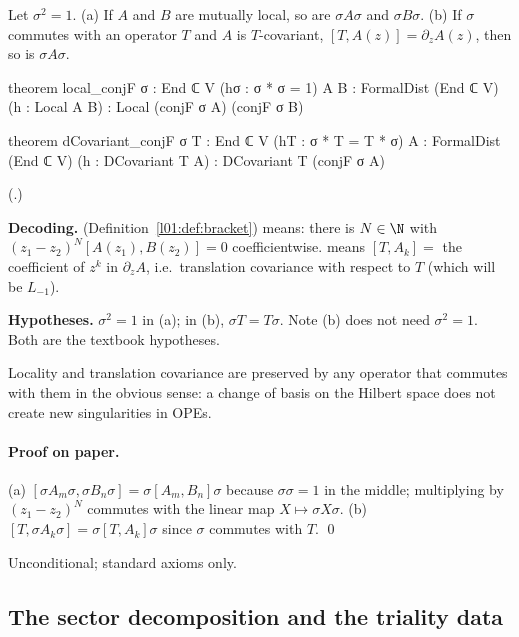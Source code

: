 \begin{proposition}\label{ch14:prop:conj}
Let $\sigma^2=1$.  (a) If $A$ and $B$ are mutually local, so are $\sigma A\sigma$ and $\sigma B\sigma$.
(b) If $\sigma$ commutes with an operator $T$ and $A$ is $T$-covariant, $[T,A(z)]=\partial_zA(z)$,
then so is $\sigma A\sigma$.
\end{proposition}
\begin{leancode}
theorem local_conjF {σ : End ℂ V} (hσ : σ * σ = 1) {A B : FormalDist (End ℂ V)}
    (h : Local A B) : Local (conjF σ A) (conjF σ B)

theorem dCovariant_conjF {σ T : End ℂ V} (hT : σ * T = T * σ)
    {A : FormalDist (End ℂ V)} (h : DCovariant T A) : DCovariant T (conjF σ A)
\end{leancode}
(.)

\begin{dictionary}
\textbf{Decoding.}   (Definition~\ref{l01:def:bracket}) means: there is $N\in\N$ with
$(z_1-z_2)^N[A(z_1),B(z_2)]=0$ coefficientwise.   means
$[T,A_k]=$ the coefficient of $z^k$ in $\partial_z A$, i.e.\ translation covariance with respect to
$T$ (which will be $L_{-1}$).

\textbf{Hypotheses.}  $\sigma^2=1$ in (a); in (b), $\sigma T=T\sigma$.  Note (b) does not need
$\sigma^2=1$.  Both are the textbook hypotheses.
\end{dictionary}
\begin{physics}
Locality and translation covariance are preserved by any operator that commutes with them in the obvious sense: a change of basis on the Hilbert space does not create new singularities in OPEs.
\end{physics}


\paragraph{Proof on paper.}  (a) $[\sigma A_m\sigma,\sigma B_n\sigma]=\sigma[A_m,B_n]\sigma$ because
$\sigma\sigma=1$ in the middle; multiplying by $(z_1-z_2)^N$ commutes with the linear map
$X\mapsto\sigma X\sigma$.  (b) $[T,\sigma A_k\sigma]=\sigma[T,A_k]\sigma$ since $\sigma$ commutes
with $T$. \qed

\begin{status}Unconditional; standard axioms only.\end{status}

\subsection{The sector decomposition and the triality data}

